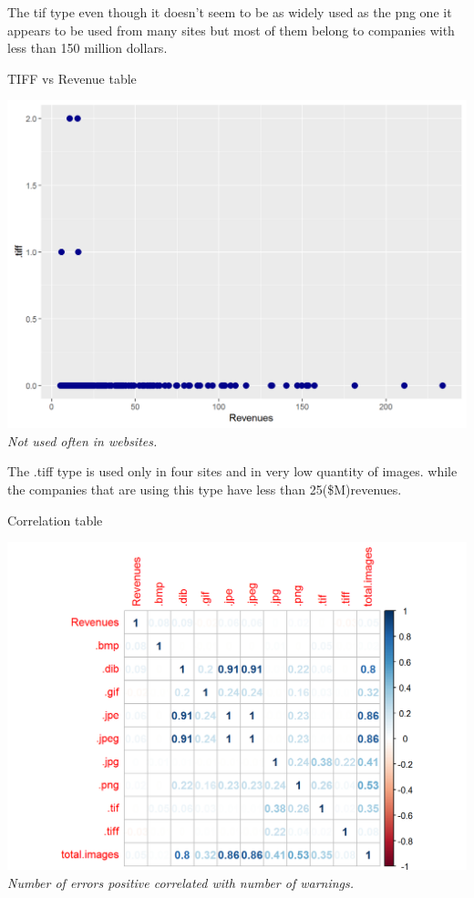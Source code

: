 \documentclass{book}
\begin{document}
The tif type even though it doesn't seem to be as widely used as the png one it appears to be used from many sites but most of them belong to companies with less than 150 million dollars.
\begin{table}[H]
\centering
\caption{TIFF vs Revenue table}
\begin{center}
\includegraphics[scale=0.5]{../R/photos/62_tiff_rev.png}    \\
\textit{Not used often in websites.}
\end{center}
\end{table}
The .tiff type is used only in four sites and in very low quantity of images. while the companies that are using this type have less than 25(\$M)revenues.
\begin{table}[H]
\centering
\caption{Correlation table}
\begin{center}
\includegraphics[scale=0.5]{../R/photos/63_img_cor.png}    \\
\textit{Number of errors positive correlated with number of warnings.}
\end{center}
\end{table}
\end{document}

